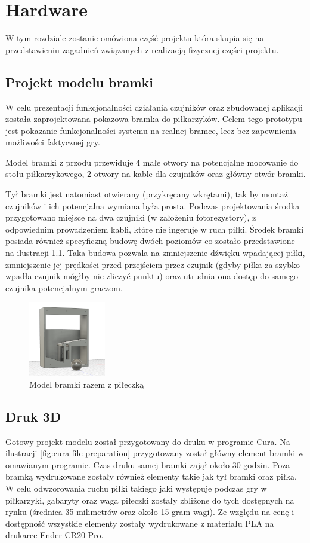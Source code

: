 \chapter{Hardware}
\label{ch:funplenop}
W tym rozdziale zostanie omówiona część projektu która skupia się na przedstawieniu zagadnień związanych z realizacją fizycznej części projektu.

\section{Projekt modelu bramki}
W celu prezentacji funkcjonalności działania czujników oraz zbudowanej aplikacji została zaprojektowana pokazowa bramka do piłkarzyków. Celem tego prototypu jest pokazanie funkcjonalności systemu na realnej bramce, lecz bez zapewnienia możliwości faktycznej gry. 

Model bramki z przodu przewiduje 4 małe otwory na potencjalne mocowanie do stołu piłkarzykowego, 2 otwory na kable dla czujników oraz główny otwór bramki.

Tył bramki jest natomiast otwierany (przykręcany wkrętami), tak by montaż czujników i ich potencjalna wymiana była prosta. Podczas projektowania środka przygotowano miejsce na dwa czujniki (w założeniu fotorezystory), z odpowiednim prowadzeniem kabli, które nie ingeruje w ruch piłki. Środek bramki posiada również specyficzną budowę dwóch poziomów co zostało przedstawione na ilustracji \ref{fig:inside-of-gate-model}. Taka budowa pozwala na zmniejszenie dźwięku wpadającej piłki, zmniejszenie jej prędkości przed przejściem przez czujnik (gdyby piłka za szybko wpadła czujnik mógłby nie zliczyć punktu) oraz utrudnia ona dostęp do samego czujnika potencjalnym graczom.

\begin{figure}[h!]
  \centering
    \includegraphics[width=0.3\textwidth]{images/3D/gate_inside.png}
  \caption{Model bramki razem z piłeczką}
  \label{fig:inside-of-gate-model}
\end{figure}

\section{Druk 3D}
Gotowy projekt modelu został przygotowany do druku w programie Cura. Na ilustracji \ref{fig:cura-file-preparation} przygotowany został główny element bramki w omawianym programie. Czas druku samej bramki zajął około 30 godzin. Poza bramką wydrukowane zostały również elementy takie jak tył bramki oraz piłka. W celu odwzorowania ruchu piłki takiego jaki występuje podczas gry w piłkarzyki, gabaryty oraz waga piłeczki zostały zbliżone do tych dostępnych na rynku (średnica 35 milimetrów oraz około 15 gram wagi). Ze względu na cenę i dostępność wszystkie elementy zostały wydrukowane z materiału PLA na drukarce Ender CR20 Pro.

